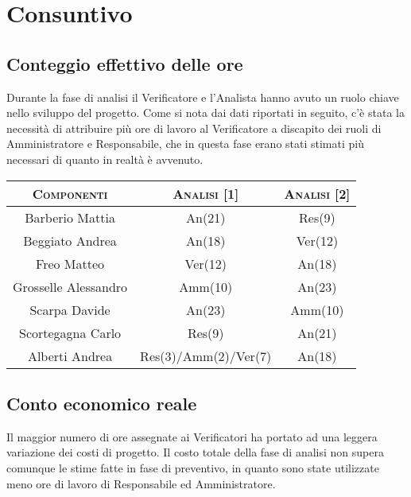 \documentclass[11pt,a4paper]{article}
\begin{document}
\section{Consuntivo}
\subsection{Conteggio effettivo delle ore}
Durante la fase di analisi il Verificatore e l'Analista hanno avuto un ruolo chiave nello sviluppo del progetto.
Come si nota dai dati riportati in seguito, c'è stata la necessità di attribuire più ore di lavoro al Verificatore a discapito dei ruoli di Amministratore e Responsabile, che in questa fase erano stati stimati più necessari di quanto in realtà è avvenuto.
\\
\begin{center}
\begin{tabular}{|c||c|c|}
\hline
\textsc{Componenti} & \textsc{Analisi [1]} & \textsc{Analisi [2]} \\ \hline \hline
Barberio Mattia & An(21) & Res(9) \\ \hline
Beggiato Andrea & An(18) & Ver(12) \\ \hline
Freo Matteo & Ver(12) & An(18) \\ \hline
Grosselle Alessandro & Amm(10) & An(23) \\ \hline
Scarpa Davide & An(23) & Amm(10) \\ \hline
Scortegagna Carlo & Res(9) & An(21) \\ \hline
Alberti Andrea & Res(3)/Amm(2)/Ver(7) & An(18) \\ \hline
\end{tabular}
\end{center}
\bigskip
\subsection{Conto economico reale}
Il maggior numero di ore assegnate ai Verificatori ha portato ad una leggera variazione dei costi di progetto.
Il costo totale della fase di analisi non supera comunque le stime fatte in fase di preventivo, in quanto sono state utilizzate meno ore di lavoro di Responsabile ed Amministratore.
\end{document}
